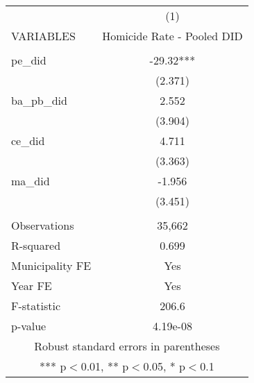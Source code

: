 \documentclass[]{article}
\begin{document}
\begin{tabular}{lc} \hline
 & (1) \\
VARIABLES & Homicide Rate - Pooled DID \\ \hline
 &  \\
pe\_did & -29.32*** \\
 & (2.371) \\
ba\_pb\_did & 2.552 \\
 & (3.904) \\
ce\_did & 4.711 \\
 & (3.363) \\
ma\_did & -1.956 \\
 & (3.451) \\
 &  \\
Observations & 35,662 \\
R-squared & 0.699 \\
Municipality FE & Yes \\
Year FE & Yes \\
F-statistic & 206.6 \\
 p-value & 4.19e-08 \\ \hline
\multicolumn{2}{c}{ Robust standard errors in parentheses} \\
\multicolumn{2}{c}{ *** p$<$0.01, ** p$<$0.05, * p$<$0.1} \\
\end{tabular}
\end{document}
